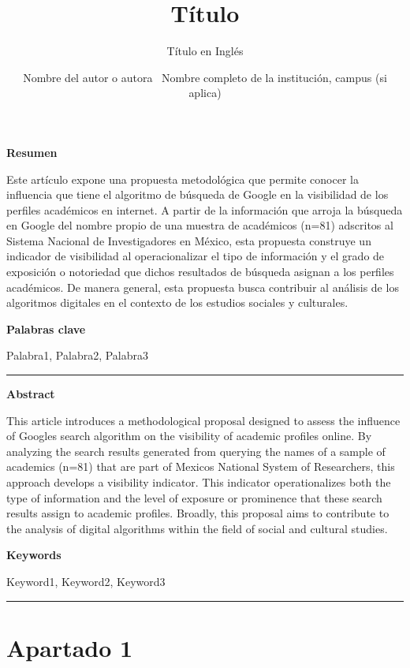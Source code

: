 \documentclass[
  13pt,
]{interact}
\title{Título}
\subtitle{Título en Inglés}
\author{Nombre del autor o autora \textbar\ Nombre completo de la
institución, campus (si aplica)}
\begin{document}
\captionsetup{labelsep=space}
\maketitle


\newcommand{\articuloTitulo}{Hegemonía algorítmica}

\textbf{Resumen}

Este artículo expone una propuesta metodológica que permite conocer la
influencia que tiene el algoritmo de búsqueda de Google en la
visibilidad de los perfiles académicos en internet. A partir de la
información que arroja la búsqueda en Google del nombre propio de una
muestra de académicos (n=81) adscritos al Sistema Nacional de
Investigadores en México, esta propuesta construye un indicador de
visibilidad al operacionalizar el tipo de información y el grado de
exposición o notoriedad que dichos resultados de búsqueda asignan a los
perfiles académicos. De manera general, esta propuesta busca contribuir
al análisis de los algoritmos digitales en el contexto de los estudios
sociales y culturales.

\textbf{Palabras clave}

Palabra1, Palabra2, Palabra3

\begin{center}\rule{0.5\linewidth}{0.5pt}\end{center}

\textbf{Abstract}

This article introduces a methodological proposal designed to assess the
influence of Google\textquotesingle s search algorithm on the visibility
of academic profiles online. By analyzing the search results generated
from querying the names of a sample of academics (n=81) that are part of
Mexico\textquotesingle s National System of Researchers, this approach
develops a visibility indicator. This indicator operationalizes both the
type of information and the level of exposure or prominence that these
search results assign to academic profiles. Broadly, this proposal aims
to contribute to the analysis of digital algorithms within the field of
social and cultural studies.

\textbf{Keywords}

Keyword1, Keyword2, Keyword3

\begin{center}\rule{0.5\linewidth}{0.5pt}\end{center}

\section{Apartado 1}\label{apartado-1}
\end{document}
